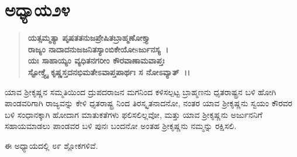 \section*{ಅಧ್ಯಾಯ\enginline{-}೨೪}

\begin{verse}
\textbf{ಯತ್ಸಮ್ಮತ್ಯಾ ಪೃಷತತನುಜಪ್ರೇಷಿತಬ್ರಾಹ್ಮಣೋಕ್ತ್ಯಾ }\\\textbf{ರಾಜ್ಯಂ ನಾದಾದನುಜಜನಿತಸ್ಯಾಂಬಿಕೇಯೋsರ್ಜುನಸ್ಯ~।}\\\textbf{ಯಃ ಸಾಹಾಯ್ಯಂ ವ್ಯಧಿತನಗರೀಂ ಕೌರವಾಣಾಮವಾಪ್ತಃ }\\\textbf{ ಸ್ಟೋಕ್ತ್ಯೈ ಕೃಷ್ಣಸ್ತದನಭಿಮತೇಽವಾಪ್ತಪಾರ್ಥಃ ಸ ನೋಽವ್ಯಾತ್~।।}
\end{verse}

ಯಾವ ಶ‍್ರೀಕೃಷ್ಣನ ಸಮ್ಮತಿಯಿಂದ ದ್ರುಪದರಾಜನ ಮಗನಿಂದ ಕಳಿಸಲ್ಪಟ್ಟ ಬ್ರಾಹ್ಮಣನು ಧೃತರಾಷ್ಟ್ರನ ಬಳಿ ಹೋಗಿ ಪಾಂಡವರಿಗಾಗಿ ರಾಜ್ಯವನ್ನು ಕೇಳಿ ಧೃತರಾಷ್ಟ್ರ ನಿಂದ ತಿರಸ್ಕೃತನಾದನೋ, ನಂತರ ಯಾವ ಶ‍್ರೀಕೃಷ್ಣನು ಸ್ವಯಂ ಕೌರವರ ಬಳಿ ಸಂಧಾನಕ್ಕಾಗಿ ಹೋದಾಗ ಮಾತುಕತೆಗಳು ಫಲಿಸಲಿಲ್ಲವೋ, ಮತ್ತು ಯಾವ ಶ‍್ರೀಕೃಷ್ಣನು ಅರ್ಜುನನಿಗೆ ಸಹಾಯಮಾಡಲು ಪಾಂಡವರ ಬಳಿ ಪುನಃ ಬಂದನೋ ಅಂತಹ ಶ‍್ರೀಕೃಷ್ಣನು ನಮ್ಮನ್ನು ರಕ್ಷಿಸಲಿ.

ಈ ಅಧ್ಯಾಯದಲ್ಲಿ ೮೯ ಶ್ಲೋಕಗಳಿವೆ.

